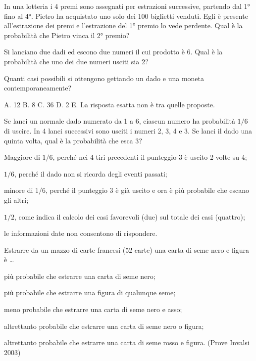 \begin{esercizio} %
In una lotteria i 4 premi sono assegnati per estrazioni successive, partendo dal 1° fino al 4°. Pietro ha acquistato uno solo dei 100 biglietti venduti. Egli è presente all'estrazione dei premi e l'estrazione del 1° premio lo vede perdente. Qual è la probabilità che Pietro vinca il 2° premio?
\end{esercizio}

\begin{esercizio} %
Si lanciano due dadi ed escono due numeri il cui prodotto è 6. Qual è la probabilità che uno dei due numeri usciti sia 2?
\end{esercizio}

\begin{esercizio} %
Quanti casi possibili si ottengono gettando un dado e una moneta contemporaneamente?

A. 12 \quad B. 8 \quad C. 36 \quad D. 2 \quad E. La risposta esatta non è tra quelle proposte.
\end{esercizio}

\begin{esercizio} %
 Se lanci un normale dado numerato da 1 a 6, ciascun numero ha probabilità $1/6$ di uscire. In 4 lanci successivi sono usciti i numeri 2, 3, 4 e 3. Se lanci il dado una quinta volta, qual è la probabilità che esca 3?
\begin{itemize*}
\item Maggiore di $1/6$, perché nei 4 tiri precedenti il punteggio 3 è uscito 2 volte su 4;
\item $1/6$, perché il dado non si ricorda degli eventi passati;
\item minore di $1/6$, perché il punteggio 3 è già uscito e ora è più probabile che escano gli altri;
\item $1/2$, come indica il calcolo dei casi favorevoli (due) sul totale dei casi (quattro);
\item le informazioni date non consentono di rispondere.
\end{itemize*}
\end{esercizio}

\begin{esercizio} %
 Estrarre da un mazzo di carte francesi (52 carte) una carta di seme nero e figura è \ldots
\begin{itemize*}
\item più probabile che estrarre una carta di seme nero;
\item più probabile che estrarre una figura di qualunque seme;
\item meno probabile che estrarre una carta di seme nero e asso;
\item altrettanto probabile che estrarre una carta di seme nero o figura;
\item altrettanto probabile che estrarre una carta di seme rosso e figura. (Prove Invalsi 2003)
\end{itemize*}
\end{esercizio}

